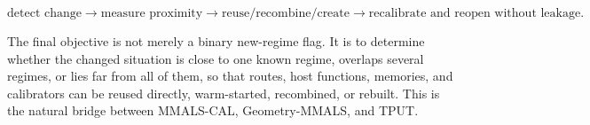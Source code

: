 \begin{equation}
\text{detect change}\rightarrow\text{measure proximity}\rightarrow\text{reuse/recombine/create}\rightarrow\text{recalibrate and reopen without leakage}.
\end{equation}

The final objective is not merely a binary new-regime flag. It is to determine whether the changed situation is close to one known regime, overlaps several regimes, or lies far from all of them, so that routes, host functions, memories, and calibrators can be reused directly, warm-started, recombined, or rebuilt. This is the natural bridge between MMALS-CAL, Geometry-MMALS, and TPUT.

